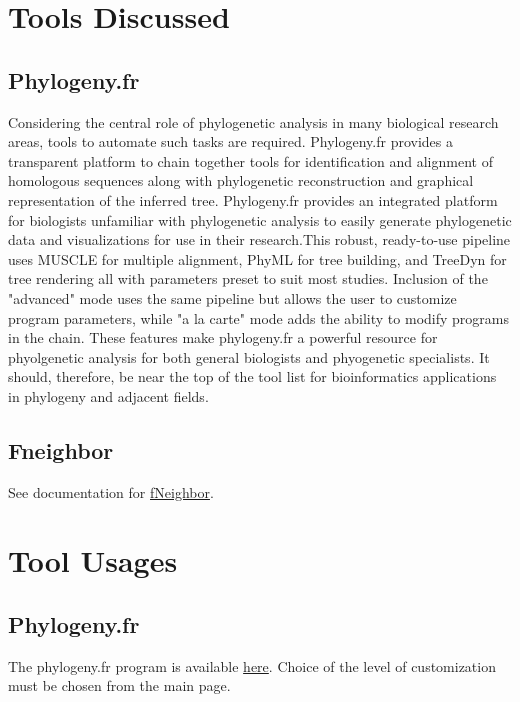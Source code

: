 \section{Tools Discussed}

    \subsection{Phylogeny.fr}

    Considering the central role of phylogenetic analysis in many biological research areas, tools to automate such tasks are required.\autocite{B9} Phylogeny.fr provides a transparent platform to chain together tools for identification and alignment of homologous sequences along with phylogenetic reconstruction and graphical representation of the inferred tree.\autocite{B9} Phylogeny.fr provides an integrated platform for biologists unfamiliar with phylogenetic analysis to easily generate phylogenetic data and visualizations for use in their research.\autocite{B9}This robust, ready-to-use pipeline uses MUSCLE for multiple alignment, PhyML for tree building, and TreeDyn for tree rendering all with parameters preset to suit most studies.\autocite{B9} Inclusion of the "advanced" mode uses the same pipeline but allows the user to customize program parameters, while "a la carte" mode adds the ability to modify programs in the chain.\autocite{B9} These features make phylogeny.fr a powerful resource for phyolgenetic analysis for both general biologists and phyogenetic specialists. It should, therefore, be near the top of the tool list for bioinformatics applications in phylogeny and adjacent fields.
    
    \subsection{Fneighbor}

    See documentation for \href{http://bioinfo.nhri.org.tw/cgi-bin/emboss/help/fneighbor}{fNeighbor}.

\section{Tool Usages}

    \subsection{Phylogeny.fr}

    The phylogeny.fr program is available \href{http://www.phylogeny.fr/}{here}. Choice of the level of customization must be chosen from the main page.

